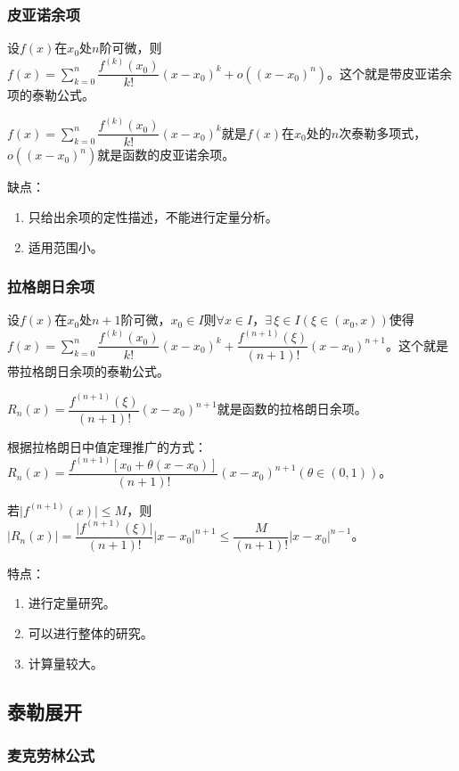 \documentclass[UTF8, 12pt]{ctexart}
\begin{document}
\subsubsection{皮亚诺余项}

设$f(x)$在$x_0$处$n$阶可微，则$f(x)=\sum_{k=0}^n\dfrac{f^{(k)}(x_0)}{k!}(x-x_0)^k+o((x-x_0)^n)$。这个就是带皮亚诺余项的泰勒公式。

$f(x)=\sum_{k=0}^n\dfrac{f^{(k)}(x_0)}{k!}(x-x_0)^k$就是$f(x)$在$x_0$处的$n$次泰勒多项式，$o((x-x_0)^n)$就是函数的皮亚诺余项。

缺点：

\begin{enumerate}
    \item 只给出余项的定性描述，不能进行定量分析。
    \item 适用范围小。
\end{enumerate}

\subsubsection{拉格朗日余项}

设$f(x)$在$x_0$处$n+1$阶可微，$x_0\in I$则$\forall x\in I$，$\exists\,\xi\in I(\xi\in(x_0,x))$使得$f(x)=\sum_{k=0}^n\dfrac{f^{(k)}(x_0)}{k!}(x-x_0)^k+\dfrac{f^{(n+1)}(\xi)}{(n+1)!}(x-x_0)^{n+1}$。这个就是带拉格朗日余项的泰勒公式。

$R_n(x)=\dfrac{f^{(n+1)}(\xi)}{(n+1)!}(x-x_0)^{n+1}$就是函数的拉格朗日余项。

根据拉格朗日中值定理推广的方式：$R_n(x)=\dfrac{f^{(n+1)}[x_0+\theta(x-x_0)]}{(n+1)!}(x-x_0)^{n+1}(\theta\in(0,1))$。

若$\vert f^{(n+1)}(x)\vert\leqslant M$，则$\vert R_n(x)\vert=\dfrac{\vert f^{(n+1)}(\xi)\vert}{(n+1)!}\vert x-x_0\vert^{n+1}\leqslant\dfrac{M}{(n+1)!}\vert x-x_0\vert^{n-1}$。

特点：

\begin{enumerate}
    \item 进行定量研究。
    \item 可以进行整体的研究。
    \item 计算量较大。
\end{enumerate}

\subsection{泰勒展开}

\subsubsection{麦克劳林公式}
\end{document}
